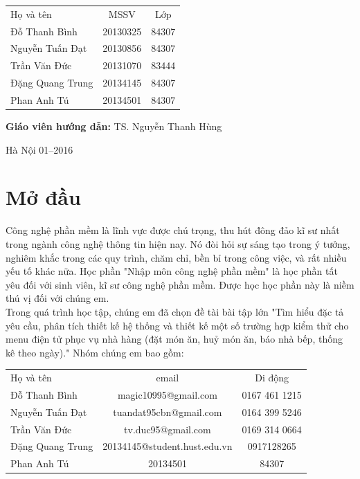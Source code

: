 \documentclass[a4paper,12pt]{report}
\begin{document}
\begin{longtable}{l c c}

Họ và tên & MSSV  & Lớp\\
Đỗ Thanh Bình & 20130325 & 84307 \\
Nguyễn Tuấn Đạt &  20130856 & 84307 \\
Trần Văn  Đức & 20131070 & 83444 \\
Đặng Quang Trung & 20134145  & 84307 \\
Phan Anh Tú & 20134501  & 84307 \\

\end{longtable}

\hspace{1cm}\fontsize{14}{16}\selectfont \textbf{Giáo viên hướng dẫn: }TS. Nguyễn Thanh Hùng\\[2cm]
\begin{center}
\fontsize{16}{19}\selectfont Hà Nội 01--2016

\end{center}
\newpage
\tableofcontents
\chapter*{Mở đầu}
Công nghệ phần mềm là lĩnh vực được chú trọng, thu hút đông đảo kĩ sư nhất trong ngành công nghệ thông tin hiện nay. Nó đòi hỏi sự sáng tạo trong ý tưởng, nghiêm khắc trong các quy trình, chăm chỉ, bền bỉ trong công việc, và rất nhiều yếu tố khác nữa. Học phần "Nhập môn công nghệ phần mềm" là học phần tất yêu đối với sinh viên, kĩ sư công nghệ phần mềm. Được học học phần này là niềm thú vị đối với chúng em.\\

Trong quá trình học tập, chúng em đã chọn đề tài bài tập lớn "Tìm	hiểu đặc	tả yêu	cầu,	phân	tích	thiết	kế hệ thống	và	thiết	kế một	số
trường	hợp	kiểm	thử cho menu	điện	tử phục	vụ nhà	hàng (đặt	món	ăn,	huỷ món	
ăn,	báo	nhà	bếp,	thống	kê	theo	ngày)." Nhóm chúng em bao gồm:\\
\begin{longtable}{l c c}

Họ và tên & email  & Di động\\
Đỗ Thanh Bình & magic10995@gmail.com & 0167 461 1215 \\
Nguyễn Tuấn Đạt &  tuandat95cbn@gmail.com & 0164 399 5246 \\
Trần Văn  Đức & tv.duc95@gmail.com & 0169 314 0664 \\
Đặng Quang Trung & 20134145@student.hust.edu.vn  & 0917128265 \\
Phan Anh Tú & 20134501  & 84307 \\
\end{longtable}
\end{document}
